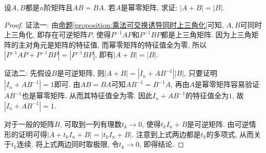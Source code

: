\documentclass[../../main.tex]{subfiles}%
\begin{document}
\begin{example}
设\(A,B\)都是\(n\)阶矩阵且\(AB = BA\). 若\(A\)是幂零矩阵, 求证: \(|A + B| = |B|\).
\end{example}
\begin{proof}

{\color{blue}证法一:} 由\hyperref[proposition:乘法可交换诱导同时上三角化]{命题\ref{proposition:乘法可交换诱导同时上三角化}}可知, \(A,B\)可同时上三角化, 即存在可逆矩阵\(P\), 使得\(P^{-1}AP\)和\(P^{-1}BP\)都是上三角矩阵. 因为上三角矩阵的主对角元是矩阵的特征值, 而幂零矩阵的特征值全为零, 所以\(|P^{-1}AP + P^{-1}BP| = |P^{-1}BP|\), 即有\(|A + B| = |B|\).
    
{\color{blue}证法二:} 先假设\(B\)是可逆矩阵, 则\(|A + B| = |I_{n}+AB^{-1}||B|\), 只要证明\(|I_{n}+AB^{-1}| = 1\)即可. 由\(AB = BA\)可知\(AB^{-1}=B^{-1}A\), 再由\(A\)是幂零矩阵容易验证\(AB^{-1}\)也是幂零矩阵, 从而其特征值全为零. 因此\(I_{n}+AB^{-1}\)的特征值全为\(1\), 故\(|I_{n}+AB^{-1}| = 1\). 
    
对于一般的矩阵\(B\), 可取到一列有理数\(t_{k}\to 0\), 使得\(t_{k}I_{n}+B\)是可逆矩阵. 由可逆情形的证明可得\(|A + t_{k}I_{n}+B| = |t_{k}I_{n}+B|\). 注意到上式两边都是\(t_{k}\)的多项式, 从而关于\(t_{k}\)连续. 将上式两边同时取极限, 令\(t_{k}\to 0\), 即得结论.
\end{proof}
\end{document}
